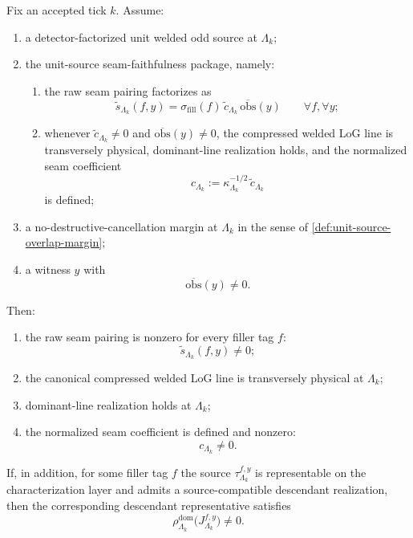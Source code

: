 \begin{theorem}
\label{thm:separate-c-nondegeneracy}
Fix an accepted tick \(k\).
Assume:
\begin{enumerate}[leftmargin=2em]
\item a detector-factorized unit welded odd source at \(\Lambda_k\);
\item the unit-source seam-faithfulness package, namely:
  \begin{enumerate}[label=(\alph*),leftmargin=2em]
  \item the raw seam pairing factorizes as
    \begin{equation}
    \widetilde s_{\Lambda_k}(f,y)
    =
    \sigma_{\mathrm{fill}}(f)\,
    \widetilde c_{\Lambda_k}\,
    \overline{\mathrm{obs}}(y)
    \qquad
    \forall f,\forall y;
    \label{eq:unit-source-seam-factorization}
    \end{equation}
  \item whenever
    \(
    \widetilde c_{\Lambda_k}\neq 0
    \)
    and
    \(
    \overline{\mathrm{obs}}(y)\neq 0
    \),
    the compressed welded LoG line is transversely physical, dominant-line realization holds, and
    the normalized seam coefficient
    \begin{equation}
    c_{\Lambda_k}
    :=
    \kappa_{\Lambda_k}^{-1/2}\,\widetilde c_{\Lambda_k}
    \label{eq:unit-source-normalized-c}
    \end{equation}
    is defined;
  \end{enumerate}
\item a no-destructive-cancellation margin at \(\Lambda_k\) in the sense of
  \cref{def:unit-source-overlap-margin};
\item a witness \(y\) with
  \[
  \overline{\mathrm{obs}}(y)\neq 0.
  \]
\end{enumerate}
Then:
\begin{enumerate}[leftmargin=2em]
\item the raw seam pairing is nonzero for every filler tag \(f\):
  \[
  \widetilde s_{\Lambda_k}(f,y)\neq 0;
  \]
\item the canonical compressed welded LoG line is transversely physical at \(\Lambda_k\);
\item dominant-line realization holds at \(\Lambda_k\);
\item the normalized seam coefficient is defined and nonzero:
  \[
  c_{\Lambda_k}\neq 0.
  \]
\end{enumerate}
If, in addition, for some filler tag \(f\) the source \(\tau^{f,y}_{\Lambda_k}\) is representable on
the characterization layer and admits a source-compatible descendant realization, then the
corresponding descendant representative satisfies
\[
\rho^{\mathrm{dom}}_{\Lambda_k}\!\big(J^{f,y}_{\Lambda_k}\big)\neq 0.
\]
\end{theorem}

